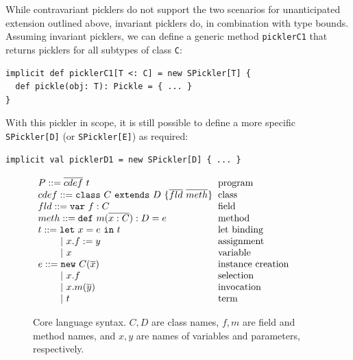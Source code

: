 \documentclass[10pt]{sigplanconf}
\theoremstyle{definition}
\theoremstyle{definition}
\newcommand{\term}[1]{\mbox{\texttt{#1}}}
\newcommand{\gap}{\quad\quad}
\newcommand{\ba}{\begin{array}}
\newcommand{\ea}{\end{array}}
\newcommand{\seq}[1]{\overline{#1}}
\begin{document}
While contravariant picklers do not support the two scenarios for
unanticipated extension outlined above, invariant picklers do, in combination
with type bounds. Assuming invariant picklers, we can define a generic method
\term{picklerC1} that returns picklers for all subtypes of class \term{C}:


\begin{lstlisting}
implicit def picklerC1[T <: C] = new SPickler[T] {
  def pickle(obj: T): Pickle = { ... }
}
\end{lstlisting}

With this pickler in scope, it is still possible to define a more specific
\term{SPickler[D]} (or \term{SPickler[E]}) as required:

\begin{lstlisting}
implicit val picklerD1 = new SPickler[D] { ... }
\end{lstlisting}

\begin{figure}
  \centering
$\ba[t]{l@{\hspace{2mm}}l}
P    ::=  \seq{cdef}~t                           & \mbox{program}             \\
cdef ::=  \texttt{class}~C~\texttt{extends}~D~\{\seq{fld}~\seq{meth}\} & \mbox{class} \\
fld  ::=  \texttt{var}~f: C                      & \mbox{field}               \\
meth ::=  \texttt{def}~m(\seq{x: C}): D = e      & \mbox{method}              \\
t    ::=  \texttt{let}~x = e~\texttt{in}~t       & \mbox{let binding}         \\
\gap ~|~ x.f := y                                & \mbox{assignment}          \\
\gap ~|~ x                                       & \mbox{variable}            \\
e    ::=  \texttt{new}~C(\seq{x})                & \mbox{instance creation}   \\
\gap ~|~ x.f                                     & \mbox{selection}           \\
\gap ~|~ x.m(\seq{y})                            & \mbox{invocation}          \\
\gap ~|~ t                                       & \mbox{term}                \\
\ea$
  \caption{Core language syntax. $C,D$ are class names, $f,m$ are ﬁeld and
    method names, and $x,y$ are names of variables and parameters, respectively.}
  \label{fig:lang-syntax}
\end{figure}
\end{document}
